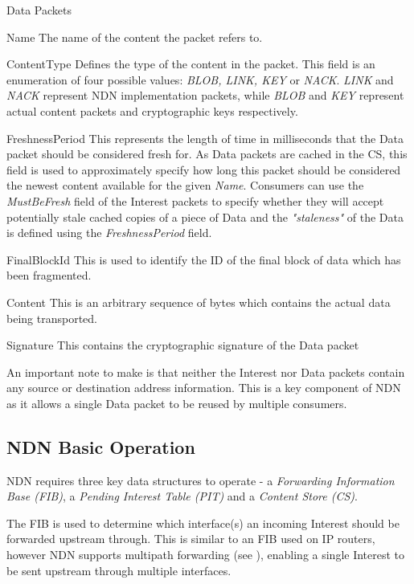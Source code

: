 \begin{labeling}{Data Packets}
    \item [Name] The name of the content the packet refers to.
    \item [ContentType] Defines the type of the content in the packet. This field is an enumeration of four possible values: \textit{BLOB, LINK, KEY} or \textit{NACK}. \textit{LINK} and \textit{NACK} represent NDN implementation packets, while \textit{BLOB} and \textit{KEY} represent actual content packets and cryptographic keys respectively.
    \item [FreshnessPeriod] This represents the length of time in milliseconds that the Data packet should be considered fresh for. As Data packets are cached in the CS, this field is used to approximately specify how long this packet should be considered the newest content available for the given \textit{Name}. Consumers can use the \textit{MustBeFresh} field of the Interest packets to specify whether they will accept potentially stale cached copies of a piece of Data and the \textit{"staleness"} of the Data is defined using the \textit{FreshnessPeriod} field.
    \item [FinalBlockId] This is used to identify the ID of the final block of data which has been fragmented.
    \item [Content] This is an arbitrary sequence of bytes which contains the actual data being transported.
    \item [Signature] This contains the cryptographic signature of the Data packet
\end{labeling}

An important note to make is that neither the Interest nor Data packets contain any source or destination address information. This is a key component of NDN as it allows a single Data packet to be reused by multiple consumers. 

\subsection{NDN Basic Operation}\label{sec:ndn-basic-operation}
NDN requires three key data structures to operate - a \textit{Forwarding Information Base (FIB)}, a \textit{Pending Interest Table (PIT)} and a \textit{Content Store (CS)}. 

The FIB is used to determine which interface(s) an incoming Interest should be forwarded upstream through. This is similar to an FIB used on IP routers, however NDN supports multipath forwarding (see ), enabling a single Interest to be sent upstream through multiple interfaces. 

